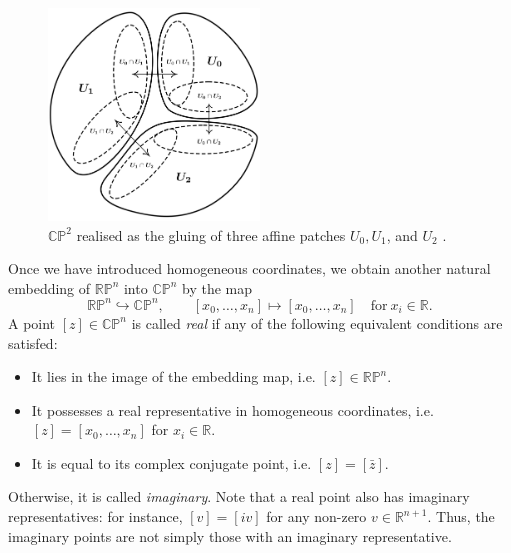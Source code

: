 \documentclass[10pt, a4paper]{article}
\theoremstyle{BoldTopSpacing}
\theoremstyle{BoldTopSpacing}
\theoremstyle{BoldTopSpacing}
\theoremstyle{BoldTopBottomSpacing}
\theoremstyle{BoldTopSpacing}
\theoremstyle{BoldTopBottomSpacing}
\theoremstyle{remark}
\begin{document}
\begin{figure}[H]
    \centering
    \includegraphics[width=0.5\textwidth]{affine-patches.png}
    \caption[$\mathbb{C}\mathbb{P}^2$ realised as the gluing of three affine patches $U_0, U_1$, and $U_2$.]{$\mathbb{C}\mathbb{P}^2$ realised as the gluing of three affine patches $U_0, U_1$, and $U_2$ \cite{toricfanovarieties2005}.}
    \label{fig:affine-patches-diagram}
\end{figure}

Once we have introduced homogeneous coordinates, we obtain another natural embedding of $\mathbb{R}\mathbb{P}^n$ into $\mathbb{C}\mathbb{P}^n$ by the map
\[
    \mathbb{R}\mathbb{P}^n \hookrightarrow \mathbb{C}\mathbb{P}^n, \quad \quad [x_{0}, \dots, x_{n}] \mapsto [x_{0}, \dots, x_{n}] \quad \text{for} \ x_{i} \in \mathbb{R}.
\]
A point $[z] \in \mathbb{C}\mathbb{P}^n$ is called \textit{real} if any of the following equivalent conditions are satisfed:
\begin{itemize}[label=$\blacktriangleright$]
    \item It lies in the image of the embedding map, i.e. $[z] \in \mathbb{R}\mathbb{P}^n$.
    \item It possesses a real representative in homogeneous coordinates, i.e. $[z] = [x_{0}, \dots, x_{n}]$ for $x_{i} \in \mathbb{R}$.
    \item It is equal to its complex conjugate point, i.e. $[z] = [\bar{z}]$.
\end{itemize}
Otherwise, it is called \textit{imaginary}. Note that a real point also has imaginary representatives: for instance, $[v] = [i v]$ for any non-zero $v \in \mathbb{R}^{n+1}$. Thus, the imaginary points are not simply those with an imaginary representative.
\end{document}
